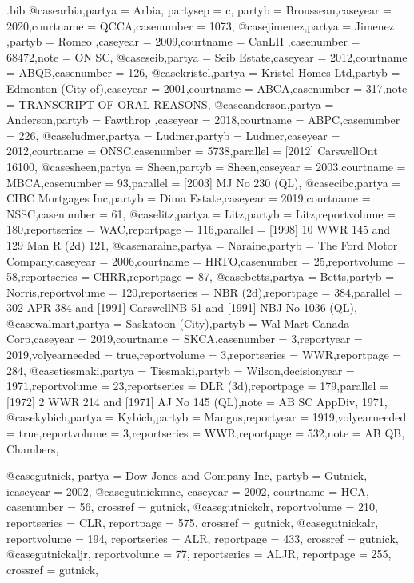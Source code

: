 \begin{filecontents*}[overwrite]{\jobname.bib}
@case{arbia,partya = {Arbia},
partysep = {c},
partyb = {Brousseau},caseyear = {2020},courtname = {QCCA},casenumber = {1073},}
@case{jimenez,partya = {Jimenez },partyb = {Romeo },caseyear = {2009},courtname = {CanLII },casenumber = {68472},note = {ON SC},}
@case{seib,partya = {Seib Estate},caseyear = {2012},courtname = {ABQB},casenumber = {126},}
@case{kristel,partya = {Kristel Homes Ltd},partyb = {Edmonton (City of)},caseyear = {2001},courtname = {ABCA},casenumber = {317},note = {TRANSCRIPT OF ORAL REASONS},}
@case{anderson,partya = {Anderson},partyb = {Fawthrop },caseyear = {2018},courtname = {ABPC},casenumber = {226},}
@case{ludmer,partya = {Ludmer},partyb = {Ludmer},caseyear = {2012},courtname = {ONSC},casenumber = {5738},parallel = {[2012] CarswellOnt 16100},}
@case{sheen,partya = {Sheen},partyb = {Sheen},caseyear = {2003},courtname = {MBCA},casenumber = {93},parallel = {[2003] MJ No 230 (QL)},}
@case{cibc,partya = {CIBC Mortgages Inc},partyb = {Dima Estate},caseyear = {2019},courtname = {NSSC},casenumber = {61},}
@case{litz,partya = {Litz},partyb = {Litz},reportvolume = {180},reportseries = {WAC},reportpage = {116},parallel = {[1998] 10 WWR 145 and 129 Man R (2d) 121},}
@case{naraine,partya = {Naraine},partyb = {The Ford Motor Company},caseyear = {2006},courtname = {HRTO},casenumber = {25},reportvolume = {58},reportseries = {CHRR},reportpage = {87},}
@case{betts,partya = {Betts},partyb = {Norris},reportvolume = {120},reportseries = {NBR (2d)},reportpage = {384},parallel = {302 APR 384 and [1991] CarswellNB 51 and [1991] NBJ No 1036 (QL)},}
@case{walmart,partya = {Saskatoon (City)},partyb = {Wal-Mart Canada Corp},caseyear = {2019},courtname = {SKCA},casenumber = {3},reportyear = {2019},volyearneeded = {true},reportvolume = {3},reportseries = {WWR},reportpage = {284},}
@case{tiesmaki,partya = {Tiesmaki},partyb = {Wilson},decisionyear = {1971},reportvolume = {23},reportseries = {DLR (3d)},reportpage = {179},parallel = {[1972] 2 WWR 214 and [1971] AJ No 145 (QL)},note = {AB SC AppDiv, 1971},}
@case{kybich,partya = {Kybich},partyb = {Mangus},reportyear = {1919},volyearneeded = {true},reportvolume = {3},reportseries = {WWR},reportpage = {532},note = {AB QB, Chambers},}








@case{gutnick,
  partya = {Dow Jones and Company Inc}, 
  partyb = {Gutnick},
  icaseyear = {2002},
  }
@case{gutnickmnc,
  caseyear = {2002},
  courtname = {HCA},
  casenumber = {56},
  crossref = {gutnick},
  }
@case{gutnickclr,
  reportvolume = {210},
  reportseries = {CLR},
  reportpage = {575},
  crossref = {gutnick},
  	}
@case{gutnickalr,
  reportvolume = {194},
  reportseries = {ALR},
  reportpage = {433},
  crossref = {gutnick},
  	}
@case{gutnickaljr,
  reportvolume = {77},
  reportseries = {ALJR},
  reportpage = {255},
  crossref = {gutnick},
  	}





\end{filecontents*}
